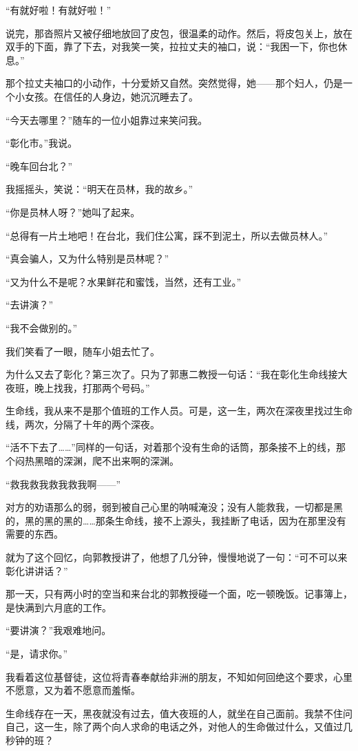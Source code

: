 \par “有就好啦！有就好啦！”
\par 说完，那沓照片又被仔细地放回了皮包，很温柔的动作。然后，将皮包关上，放在双手的下面，靠了下去，对我笑一笑，拉拉丈夫的袖口，说：“我困一下，你也休息。”
\par 那个拉丈夫袖口的小动作，十分爱娇又自然。突然觉得，她——那个妇人，仍是一个小女孩。在信任的人身边，她沉沉睡去了。
\par “今天去哪里？”随车的一位小姐靠过来笑问我。
\par “彰化市。”我说。
\par “晚车回台北？”
\par 我摇摇头，笑说：“明天在员林，我的故乡。”
\par “你是员林人呀？”她叫了起来。
\par “总得有一片土地吧！在台北，我们住公寓，踩不到泥土，所以去做员林人。”
\par “真会骗人，又为什么特别是员林呢？”
\par “又为什么不是呢？水果鲜花和蜜饯，当然，还有工业。”
\par “去讲演？”
\par “我不会做别的。”
\par 我们笑看了一眼，随车小姐去忙了。
\par 为什么又去了彰化？第三次了。只为了郭惠二教授一句话：“我在彰化生命线接大夜班，晚上找我，打那两个号码。”
\par 生命线，我从来不是那个值班的工作人员。可是，这一生，两次在深夜里找过生命线，两次，分隔了十年的两个深夜。
\par “活不下去了……”同样的一句话，对着那个没有生命的话筒，那条接不上的线，那个闷热黑暗的深渊，爬不出来啊的深渊。
\par “救我救我救我救我啊——”
\par 对方的劝语那么的弱，弱到被自己心里的呐喊淹没；没有人能救我，一切都是黑的，黑的黑的黑的……那条生命线，接不上源头，我挂断了电话，因为在那里没有需要的东西。
\par 就为了这个回忆，向郭教授讲了，他想了几分钟，慢慢地说了一句：“可不可以来彰化讲讲话？”
\par 那一天，只有两小时的空当和来台北的郭教授碰一个面，吃一顿晚饭。记事簿上，是快满到六月底的工作。
\par “要讲演？”我艰难地问。
\par “是，请求你。”
\par 我看着这位基督徒，这位将青春奉献给非洲的朋友，不知如何回绝这个要求，心里不愿意，又为着不愿意而羞惭。
\par 生命线存在一天，黑夜就没有过去，值大夜班的人，就坐在自己面前。我禁不住问自己，这一生，除了两个向人求命的电话之外，对他人的生命做过什么，又值过几秒钟的班？
